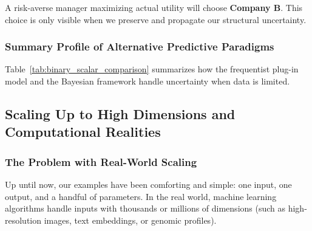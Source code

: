 \documentclass{article}
\begin{document}
A risk-averse manager maximizing actual utility will choose \textbf{Company B}. This choice is only visible when we preserve and propagate our structural uncertainty.

\subsubsection{Summary Profile of Alternative Predictive Paradigms}
Table~\ref{tab:binary_scalar_comparison} summarizes how the frequentist plug-in model and the Bayesian framework handle uncertainty when data is limited.

\begin{table}[htbp]
\centering
\small
\renewcommand{\arraystretch}{1.4}
\caption{Operational Comparison of Predictive Frameworks on Sparse Logistical Datasets}
\label{tab:binary_scalar_comparison}
\end{table}

\subsection{Scaling Up to High Dimensions and Computational Realities}

\subsubsection{The Problem with Real-World Scaling}
Up until now, our examples have been comforting and simple: one input, one output, and a handful of parameters. In the real world, machine learning algorithms handle inputs with thousands or millions of dimensions (such as high-resolution images, text embeddings, or genomic profiles). 
\end{document}
